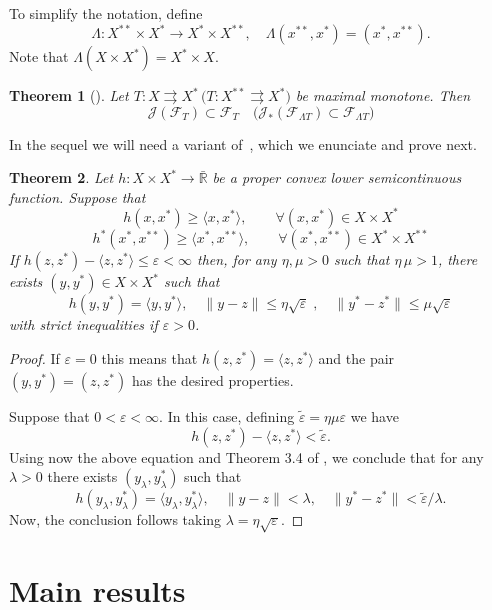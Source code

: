 \documentclass[11pt]{article}
\newcommand{\F}{\mathcal{F}}
\newcommand{\J}{\mathcal{J}}
\newcommand{\BR}{\bar{\mathbb{R}}}
\newcommand{\rot}{\Lambda}
\newcommand{\inner}[2]{\langle{#1},{#2}\rangle}
\newcommand{\norm}[1]{\|#1\|}
\newcommand{\tos}{\rightrightarrows} %
\newtheorem{theorem}{Theorem}[section]
\begin{document}
%
To simplify the notation, define
 \begin{equation}
   \label{eq:def.rot}
 \rot:X^{**}\times X^*\to X^*\times X^{**},\quad
\rot(x^{**},x^*)=(x^*,x^{**}).  
 \end{equation}
Note that $\rot(X\times X^*)=X^*\times X$.
%
\begin{theorem}[\mbox{\cite[Theorem 5.3]{bur.sva-max.sva02}}]
 \label{th:x}
 Let $T:X\tos X^*\, \big(T:X^{**}\tos X^*\big)$ be maximal
 monotone. Then
 \[
  \J(\F_T)\subset \F_T \quad \big(\J_*(\F_{\rot T})\subset \F_{\rot T}\big)
 \]
\end{theorem}
%
In the sequel we will need a variant of~\cite[Theorem
3.4]{alv.sva-bro.jca08}, which we enunciate and prove next.
%
\begin{theorem}
  \label{th:variant}
  Let $h:X\times X^*\to \BR$ be a proper convex lower semicontinuous function.
Suppose that
\[
 h(x,x^*)\geq \inner{x}{x^*},
    \qquad \forall (x,x^*)\in X\times X^*\] 
\[ h^*(x^*,x^{**})\geq \inner{x^*}{x^{**}},
   \qquad \forall (x^*,x^{**})\in X^*\times X^{**}\] 
If $ h(z,z^*)-\inner{z}{z^*}\leq \varepsilon<\infty$ then, for any
$\eta,\mu>0$ such that $\eta\,\mu>1$, there exists $(y,y^*)\in
X\times X^*$ such that
\[ h(y,y^*)=\inner{y}{y^*},\quad
   \norm{y-z}\leq \eta \sqrt{\varepsilon}\;, \quad 
   \norm{y^*-z^*}\leq \mu\sqrt{\varepsilon}
\]
with strict inequalities if $\varepsilon>0$.
\end{theorem}
\begin{proof}
  If $\varepsilon=0$ this means that $h(z,z^*)=\inner{z}{z^*}$ and the pair
  $(y, y^*)=(z,z^*)$ has the desired properties.

  Suppose that $0<\varepsilon<\infty$. In this case, defining
  $  \tilde \varepsilon=\eta\mu\varepsilon$ we have
  \[
   h(z,z^*)-\inner{z}{z^*}<\tilde\varepsilon.
  \]
  Using now the above equation and Theorem 3.4 of \cite{alv.sva-bro.jca08},
  we conclude that for any $\lambda>0$ there
  exists $(y_\lambda,y_\lambda^*)$ such that
  \[   h(y_\lambda,y_\lambda^*)=\inner{y_\lambda}{y_\lambda^*},\quad
   \norm{y-z}< \lambda, \quad 
   \norm{y^*-z^*}< \tilde \varepsilon/\lambda.
   \]
   Now, the conclusion follows taking $\lambda=\eta\sqrt{\varepsilon}$.
\end{proof}



\section{Main results}
\end{document}
